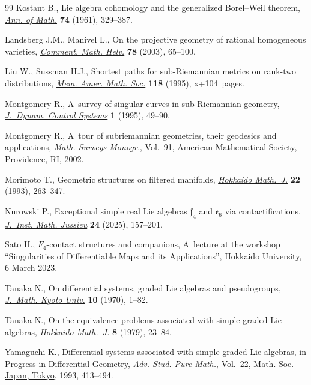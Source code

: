 \documentclass[pdftex]{sigma}
\numberwithin{equation}{section}
\theoremstyle{definition}
\newcommand{\0}{\boldsymbol{0}}
\begin{document}
\begin{thebibliography}{99}
Kostant B., Lie algebra cohomology and the generalized {B}orel--{W}eil theorem,
 \href{https://doi.org/10.2307/1970237}{\textit{Ann. of Math.}} \textbf{74}
 (1961), 329--387.

Landsberg J.M., Manivel L., On the projective geometry of rational homogeneous
 varieties, \href{https://doi.org/10.1007/s000140300003}{\textit{Comment.
 Math. Helv.}} \textbf{78} (2003), 65--100.

Liu W., Sussman H.J., Shortest paths for sub-{R}iemannian metrics on rank-two
 distributions, \href{https://doi.org/10.1090/memo/0564}{\textit{Mem. Amer.
 Math. Soc.}} \textbf{118} (1995), x+104~pages.

Montgomery R., A~survey of singular curves in sub-{R}iemannian geometry,
 \href{https://doi.org/10.1007/BF02254656}{\textit{J.~Dynam. Control Systems}}
 \textbf{1} (1995), 49--90.

Montgomery R., A~tour of subriemannian geometries, their geodesics and
 applications, \textit{Math. Surveys Monogr.}, Vol.~91,
 \href{https://doi.org/10.1090/surv/091}{American Mathematical Society},
 Providence, RI, 2002.

Morimoto T., Geometric structures on filtered manifolds,
 \href{https://doi.org/10.14492/hokmj/1381413178}{\textit{Hokkaido Math.~J.}}
 \textbf{22} (1993), 263--347.

Nurowski P., Exceptional simple real {L}ie algebras {$\mathfrak{f}_4$} and
 {$\mathfrak{e}_6$} via contactifications,
 \href{https://doi.org/10.1017/S1474748024000173}{\textit{J.~Inst. Math.
 Jussieu}} \textbf{24} (2025), 157--201.

Sato H., $F_4$-contact structures and companions, {A}~lecture at the workshop
 ``Singularities of Differentiable Maps and its Applications'', Hokkaido
 University, 6 March 2023.

Tanaka N., On differential systems, graded {L}ie algebras and pseudogroups,
 \href{https://doi.org/10.1215/kjm/1250523814}{\textit{J.~Math. Kyoto Univ.}}
 \textbf{10} (1970), 1--82.

Tanaka N., On the equivalence problems associated with simple graded {L}ie
 algebras, \href{https://doi.org/10.14492/hokmj/1381758416}{\textit{Hokkaido
 Math.~J.}} \textbf{8} (1979), 23--84.

Yamaguchi K., Differential systems associated with simple graded {L}ie
 algebras, in Progress in Differential Geometry, \textit{Adv. Stud. Pure
 Math.}, Vol.~22, \href{https://doi.org/10.2969/aspm/02210413}{Math. Soc.
 Japan, Tokyo}, 1993, 413--494.

\end{thebibliography}\LastPageEnding
\end{document}
